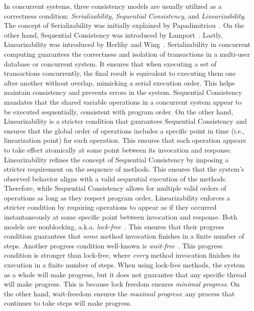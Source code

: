 In concurrent systems, three consistency models are usually utilized as a correctness condition: \textit{Serializability}, \textit{Sequential Consistency}, and \textit{Linearizability}. The concept of Serializability was initially explained by Papadimitriou~\cite{DBLP_journals_jacm_Papadimitriou79b}. On the other hand, Sequential Consistency was introduced by Lamport~\cite{lamport1979how}. Lastly, Linearizability was introduced by Herlihy and Wing~\cite{DBLP_journals_toplas_HerlihyW90DBLP_journals_toplas_HerlihyW90}.
Serializability in concurrent computing guarantees the correctness and isolation of transactions in a multi-user database or concurrent system. It ensures that when executing a set of transactions concurrently, the final result is equivalent to executing them one after another without overlap, mimicking a serial execution order. This helps maintain consistency and prevents errors in the system. 
Sequential Consistency mandates that the shared variable operations in a concurrent system appear to be executed sequentially, consistent with program order. On the other hand, Linearizability is a stricter condition that guarantees Sequential Consistency and ensures that the global order of operations includes a specific point in time (i.e., linearization point) for each operation. This ensures that each operation appears to take effect atomically at some point between its invocation and response. Linearizability refines the concept of Sequential Consistency by imposing a stricter requirement on the sequence of methods. This ensures that the system's observed behavior aligns with a valid sequential execution of the methods. Therefore, while Sequential Consistency allows for multiple valid orders of operations as long as they respect program order, Linearizability enforces a stricter condition by requiring operations to appear as if they occurred instantaneously at some specific point between invocation and response. Both models are nonblocking, a.k.a. \textit{lock-free}~\cite{DBLP_journals_toplas_HerlihyW90DBLP_journals_toplas_HerlihyW90}. This ensures that their progress condition guarantees that \textit{some} method invocation finishes in a finite number of steps. Another progress condition well-known is \textit{wait-free}~\cite{DBLP_journals_toplas_Herlihy91}. This progress condition is stronger than lock-free, where \textit{every} method invocation finishes its execution in a finite number of steps. When using lock-free methods, the system as a whole will make progress, but it does not guarantee that any specific thread will make progress. This is because lock freedom ensures \textit{minimal progress}. On the other hand, wait-freedom ensures the \textit{maximal progress}: any process that continues to take steps will make progress.


